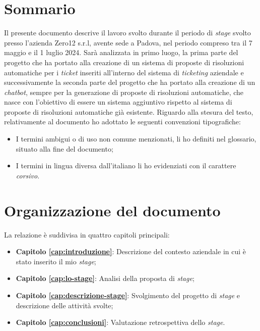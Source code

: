 \cleardoublepage
{}
{}
\begingroup
\let\clearpage\relax
\let\cleardoublepage\relax
\let\cleardoublepage\relax

\chapter*{Sommario}

Il presente documento descrive il lavoro svolto durante il periodo di \textit{stage} svolto presso l'azienda Zero12 s.r.l, avente sede a Padova, nel periodo compreso tra il 7 maggio e il 1 luglio 2024.
Sarà analizzata in primo luogo, la prima parte del progetto che ha portato alla creazione di un sistema di proposte di risoluzioni automatiche per i \textit{ticket} inseriti all'interno del sistema di \textit{ticketing} aziendale e successivamente
la seconda parte del progetto che ha portato alla creazione di un \textit{chatbot}, sempre per la generazione di proposte di risoluzioni automatiche, che nasce con l'obiettivo di essere un sistema aggiuntivo rispetto al sistema di proposte di risoluzioni automatiche già esistente.
Riguardo alla stesura del testo, relativamente al documento ho adottato le seguenti convenzioni tipografiche:
\begin{itemize}
    \item I termini ambigui o di uso non comune menzionati, li ho definiti nel glossario, situato alla fine del documento;
    \item I termini in lingua diversa dall'italiano li ho evidenziati con il carattere \emph{corsivo}.
\end{itemize}

{}
\chapter*{Organizzazione del documento}
La relazione è suddivisa in quattro capitoli principali:
\begin{itemize}
    \item \textbf{Capitolo \ref{cap:introduzione}}: Descrizione del contesto aziendale in cui è stato inserito il mio \textit{stage};
    \item \textbf{Capitolo \ref{cap:lo-stage}}: Analisi della proposta di \textit{stage};
    \item \textbf{Capitolo \ref{cap:descrizione-stage}}: Svolgimento del progetto di \textit{stage} e descrizione delle attività svolte;
    \item \textbf{Capitolo \ref{cap:conclusioni}}: Valutazione retrospettiva dello \textit{stage}.
\end{itemize}




\endgroup

\vfill
